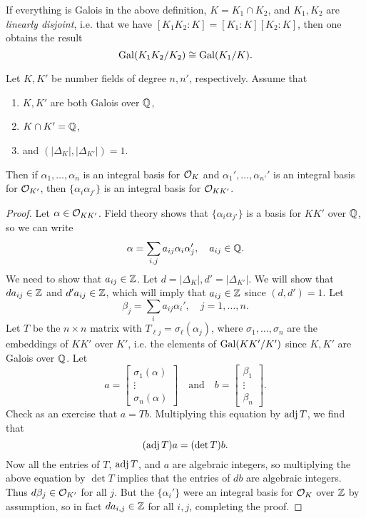 \begin{remark}
  If everything is Galois in the above definition,
  $K = K_1 \cap K_2$, and
  $K_1, K_2$ are \emph{linearly disjoint}, i.e.
  that we have
  $[K_1 K_2 : K] = [K_1 : K] [K_2 : K]$, then
  one obtains the result
  \[
    \operatorname{Gal}(K_1 K_2 / K_2) \cong \operatorname{Gal}(K_1 / K).
  \]
\end{remark}

\begin{prop}
  Let $K, K'$ be number fields of degree $n, n'$,
  respectively.
  Assume that
  \begin{enumerate}
    \item $K, K'$ are both Galois over $\mathbb{Q}$,
    \item $K \cap K' = \mathbb{Q}$,
    \item and $(|\Delta_K|, |\Delta_{K'}|) = 1$.
  \end{enumerate}
  Then if $\alpha_1, \dots, \alpha_n$ is an integral
  basis for $\mathcal{O}_K$ and $\alpha_1', \dots, \alpha_{n'}'$
  is an integral basis for $\mathcal{O}_{K'}$, then
  $\{\alpha_i \alpha_{j'}\}$ is an integral basis
  for $\mathcal{O}_{KK'}$.
\end{prop}

\begin{proof}
  Let $\alpha \in \mathcal{O}_{KK'}$. Field theory shows that
  $\{\alpha_i \alpha_{j'}\}$ is a basis for
  $KK'$ over $\mathbb{Q}$, so we can write
  \[
    \alpha = \sum_{i, j} a_{ij} \alpha_i \alpha_{j}',
    \quad a_{ij} \in \mathbb{Q}.
  \]
  We need to show that $a_{ij} \in \mathbb{Z}$. Let
  $d = |\Delta_K|, d' = |\Delta_{K'}|$. We will
  show that $d a_{ij} \in \mathbb{Z}$ and
  $d' a_{ij} \in \mathbb{Z}$, which will imply that 
  $a_{ij} \in \mathbb{Z}$ since $(d, d') = 1$. Let
  \[
    \beta_j = \sum_i a_{ij} \alpha_i', \quad j = 1, \dots, n.
  \]
  Let $T$ be the $n \times n$ matrix with
  $T_{\ell j} = \sigma_{\ell}(\alpha_j)$, where
  $\sigma_1, \dots, \sigma_n$ are the embeddings of
  $KK'$ over $K'$, i.e. the elements of
  $\operatorname{Gal}(KK' / K')$ since $K, K'$ are Galois over $\mathbb{Q}$.
  Let
  \[
    a =
    \begin{bmatrix}
      \sigma_1(\alpha) \\ \vdots \\ \sigma_n(\alpha)
    \end{bmatrix}
    \quad \text{and} \quad
    b =
    \begin{bmatrix}
      \beta_1 \\ \vdots \\ \beta_n
    \end{bmatrix}.
  \]
  Check as an exercise that $a = Tb$. Multiplying
  this equation by $\operatorname{adj} T$, we find that
  \[
    (\operatorname{adj} T) a = (\det T) b.
  \]
  Now all the entries of $T$, $\operatorname{adj} T$, and $a$
  are algebraic integers, so multiplying the above
  equation by $\det T$ implies that the entries
  of $db$ are algebraic integers. Thus
  $d\beta_j \in \mathcal{O}_{K'}$ for all $j$. But the
  $\{\alpha_i'\}$ were an integral basis for $\mathcal{O}_K$
  over $\mathbb{Z}$ by assumption, so in fact $d a_{i, j} \in \mathbb{Z}$
  for all $i, j$, completing the proof.
\end{proof}

